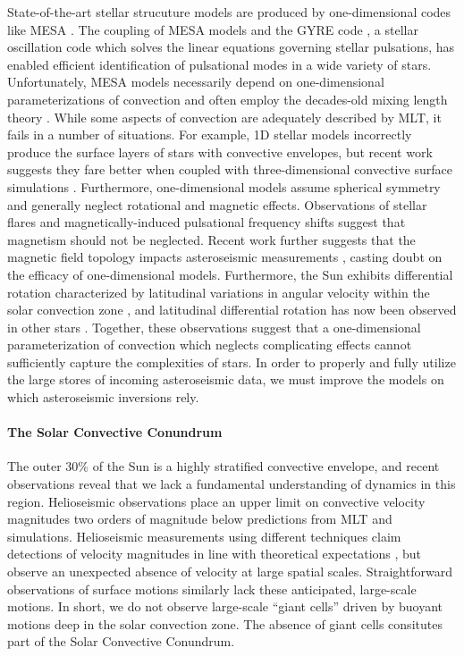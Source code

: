 \documentclass[11pt, preprint]{aastex}
\begin{document}
State-of-the-art stellar strucuture models are produced by one-dimensional codes like MESA \citep{paxton&all2011}.
The coupling of MESA models and the GYRE code \citep{townsend&teitler2013}, a stellar oscillation code which solves the linear equations governing stellar pulsations, has enabled efficient identification of pulsational modes in a wide variety of stars.
Unfortunately, MESA models necessarily depend on one-dimensional parameterizations of convection and often employ the decades-old mixing length theory \citep[MLT,][]{bohm-vitense1958}.
While some aspects of convection are adequately described by MLT, it fails in a number of situations.
For example, 1D stellar models incorrectly produce the surface layers of stars with convective envelopes, but recent work suggests they fare better when coupled with three-dimensional convective surface simulations \citep{jorgensen&weiss2019}.
Furthermore, one-dimensional models assume spherical symmetry and generally neglect rotational and magnetic effects.
Observations of stellar flares \citep{kowalski2016} and magnetically-induced pulsational frequency shifts \citep{santos&all2018} suggest that magnetism should not be neglected.
Recent work further suggests that the magnetic field topology impacts asteroseismic measurements \citep{thomas&all2019}, casting doubt on the efficacy of one-dimensional models.
Furthermore, the Sun exhibits differential rotation characterized by latitudinal variations in angular velocity within the solar convection zone \citep{thompson&all1996, schou&all1998}, and latitudinal differential rotation has now been observed in other stars \citep{benomar&all2018}.
Together, these observations suggest that a one-dimensional parameterization of convection which neglects complicating effects cannot sufficiently capture the complexities of stars.
In order to properly and fully utilize the large stores of incoming asteroseismic data, we must improve the models on which asteroseismic inversions rely.

\paragraph{The Solar Convective Conundrum}
\label{sct:convective_conundrum}
The outer 30\% of the Sun is a highly stratified convective envelope, and recent observations reveal that we lack a fundamental understanding of dynamics in this region.
Helioseismic observations \citep{hanasoge&all2012} place an upper limit on convective velocity magnitudes two orders of magnitude below predictions from MLT and simulations.
Helioseismic measurements using different techniques claim detections of velocity magnitudes in line with theoretical expectations \citep{greer&all2015}, but observe an unexpected absence of velocity at large spatial scales.
Straightforward observations of surface motions \citep{hathaway&all2015} similarly lack these anticipated, large-scale motions.
In short, we do not observe large-scale ``giant cells'' driven by buoyant motions deep in the solar convection zone.
The absence of giant cells consitutes part of the Solar Convective Conundrum.
\end{document}
